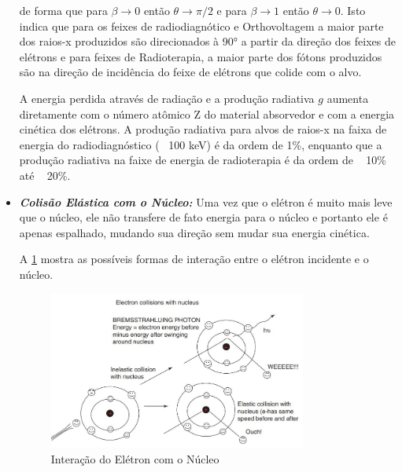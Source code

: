 \documentclass[11pt,a4paper]{article}
\begin{document}
\begin{itemize}
                de forma que para $\beta \rightarrow 0$ então $\theta \rightarrow \pi / 2$ e para $\beta \rightarrow 1$ então $\theta \rightarrow 0$. Isto indica que para os feixes de radiodiagnótico e Orthovoltagem a maior parte dos raios-x produzidos são direcionados à \ang{90} a partir da direção dos feixes de elétrons e para feixes de Radioterapia, a maior parte dos fótons produzidos são na direção de incidência do feixe de elétrons que colide com o alvo. 

                A energia perdida através de radiação e a produção radiativa $g$ aumenta diretamente com o número atômico Z do material absorvedor e com a energia cinética dos elétrons. A produção radiativa para alvos de raios-x na faixa de energia do radiodiagnóstico (~ 100 keV) é da ordem de 1\%, enquanto que a produção radiativa na faixe de energia de radioterapia é da ordem de ~ 10\% até ~ 20\%. 

                \item \textbf{\textit{\textcolor{CarnationPink}{Colisão Elástica com o Núcleo}:}} Uma vez que o elétron é muito mais leve que o núcleo, ele não transfere de fato energia para o núcleo e portanto ele é apenas espalhado, mudando sua direção sem mudar sua energia cinética. 
                
                A \ref{fig:interacaoEletronNucleo} mostra as possíveis formas de interação entre o elétron incidente e o núcleo.

                \begin{figure}[h]
                    \centering
                    \includegraphics[width=0.8\textwidth]{Imagens/interacaoEletronNucleo.JPG}
                    \caption{Interação do Elétron com o Núcleo}
                    \label{fig:interacaoEletronNucleo}                
                \end{figure}

                
            \end{itemize}
\end{document}
